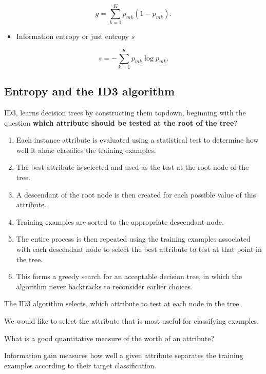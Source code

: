 \documentclass[%
oneside,                 %
final,                   %
10pt]{article}
\begin{document}
\noindent
\[
g = \sum_{k=1}^K p_{mk}(1-p_{mk}).
\]
\begin{itemize}
\item Information entropy or just entropy $s$
\end{itemize}

\noindent
\[
s = -\sum_{k=1}^K p_{mk}\log{p_{mk}}.
\]


\subsection*{Entropy and the ID3 algorithm}

ID3, learns decision trees by constructing
them topdown, beginning with the question \textbf{which attribute should be tested at the root of the tree}?

\begin{enumerate}
\item Each instance attribute is evaluated using a statistical test to determine how well it alone classifies the training examples.

\item The best attribute is selected and used as the test at the root node of the tree.

\item A descendant of the root node is then created for each possible value of this attribute.

\item Training examples are sorted to the appropriate descendant node.

\item The entire process is then repeated using the training examples associated with each descendant node to select the best attribute to test at that point in the tree.

\item This forms a greedy search for an acceptable decision tree, in which the algorithm never backtracks to reconsider earlier choices. 
\end{enumerate}

\noindent
The ID3 algorithm selects, which attribute to test at each node in the
tree.

We would like to select the attribute that is most useful for classifying
examples.

What is a good quantitative measure of the worth of an attribute?

Information gain measures how well a given attribute separates the
training examples according to their target classification.
\end{document}
